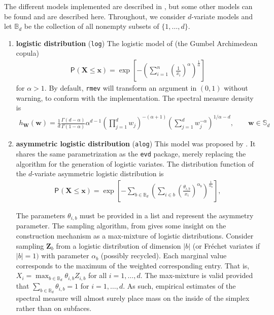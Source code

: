 \documentclass{article}\usepackage[]{graphicx}\usepackage[]{xcolor}
\newcommand{\bs}[1]{\boldsymbol {#1}}
\renewcommand{\P}[2][]{{\mathsf P}_{#1}\left(#2\right)}
\newcommand{\code}[1]{\texttt{#1}}
\newcommand{\sumi}{\sum_{i=1}^n}
\newcommand{\pfrac}[2]{\left(\frac{#1}{#2}\right)}
\begin{document}
The different models implemented are described in \cite{Dombry:2016}, but some other models can be found and are described here. Throughout, we consider $d$-variate models and let $\mathbb{B}_d$ be the collection of all nonempty subsets of $\{1, \ldots, d\}$.
\begin{enumerate}

\item \textbf{logistic distribution} (\code{log})
The logistic model of \cite{Gumbel:1960} (the Gumbel Archimedean copula)
\begin{align*}
   \P{\bs{X} \leq \bs{x}}= \exp \left[ - \left(\sumi \pfrac{1}{x_i}^{\alpha}\right)^{\frac{1}{\alpha}}\right]
\end{align*}
for $\alpha>1.$ By default, \code{rmev} will transform an argument in $(0,1)$ without warning, to conform with the
implementation. The spectral measure density is
\begin{align*}
   h_{\bs{W}}(\bs{w})=\frac{1}{d}\frac{\Gamma(d-\alpha)}{\Gamma(1-\alpha)}\alpha^{d-1}\left( \prod_{j=1}^d
w_j\right)^{-(\alpha+1)}\left(\sum_{j=1}^d
   w_j^{-\alpha}\right)^{1/\alpha-d}, \qquad \bs{w} \in \mathbb{S}_d
\end{align*}

\item \textbf{asymmetric logistic distribution} (\code{alog})
This model was proposed by  \cite{Tawn:1990}. It shares the same parametrization as the \code{evd} package, merely replacing the algorithm for the generation of logistic variates. The distribution function of the $d$-variate asymmetric logistic distribution is
\begin{align*}
   \P{\bs{X} \leq \bs{x}} = \exp \left[ -\sum_{b \in \mathbb{B}_d}\left(\sum_{i \in b} \pfrac{\theta_{i,
b}}{x_i}^{\alpha_b}\right)^{\frac{1}{\alpha_b}}\right],
\end{align*}

The parameters $\theta_{i, b}$ must be provided in a list and represent the asymmetry parameter.
The sampling algorithm, from \cite{Stephenson:2003} gives some insight on the construction mechanism as a max-mixture of logistic distributions. Consider sampling $\bs{Z}_b$ from a logistic distribution of dimension $|b|$ (or Fréchet variates if $|b|=1)$ with parameter
$\alpha_b$ (possibly recycled). Each marginal value corresponds to the maximum of the weighted corresponding entry. That
is, $X_{i}=\max_{b \in \mathbb{B}_d}\theta_{i, b}Z_{i,b}$ for all $i=1, \ldots, d$. The max-mixture is valid provided that $\sum_{b
\in \mathbb{B}_d} \theta_{i,b}=1$ for $i=1, \ldots, d.$ As such, empirical estimates of the spectral measure will almost surely
place mass on the inside of the simplex rather than on subfaces.


\end{enumerate}
\end{document}
